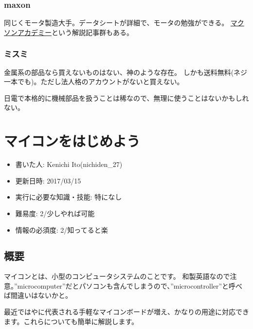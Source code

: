 \documentclass[letterpaper,10pt,dvipdfmx]{sphinxmanual}
\begin{document}
\subsection{maxon}
\label{\detokenize{begginers/buy_parts:maxon}}
同じくモータ製造大手。データシートが詳細で、モータの勉強ができる。
\href{http://academy.maxonjapan.co.jp/}{マクソンアカデミー}という解説記事群もある。


\subsection{ミスミ}
\label{\detokenize{begginers/buy_parts:id19}}
金属系の部品なら買えないものはない、神のような存在。
しかも送料無料(ネジ一本でも)。ただし法人格のアカウントがないと買えない。

日電で本格的に機械部品を扱うことは稀なので、無理に使うことはないかもしれない。


\chapter{マイコンをはじめよう}
\label{\detokenize{begginers/microcontroller::doc}}\label{\detokenize{begginers/microcontroller:id1}}\begin{itemize}
\item {} 
書いた人: Kenichi Ito(nichiden\_27)

\item {} 
更新日時: 2017/03/15

\item {} 
実行に必要な知識・技能: 特になし

\item {} 
難易度: 2/少しやれば可能

\item {} 
情報の必須度: 2/知ってると楽

\end{itemize}


\section{概要}
\label{\detokenize{begginers/microcontroller:id2}}
マイコンとは、小型のコンピュータシステムのことです。
和製英語なので注意。''microcomputer''だとパソコンも含んでしまうので、''microcontroller''と呼べば間違いはないかと。

最近ではやに代表される手軽なマイコンボードが増え、かなりの用途に対応できます。これらについても簡単に解説します。
\end{document}
